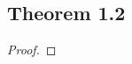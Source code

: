 \documentclass[../../main.tex]{subfiles}
\begin{document}
\subsection{Theorem 1.2}
\begin{wts}

\end{wts}
\begin{proof}

\end{proof}
\end{document}

